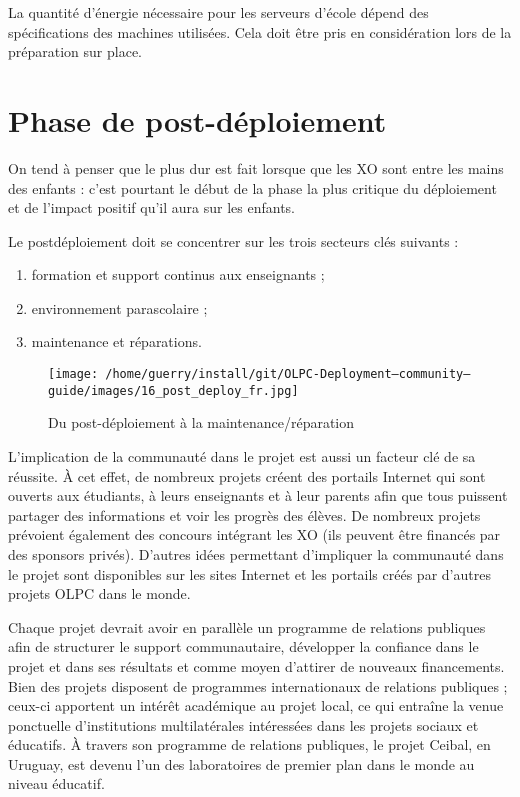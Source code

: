 \documentclass[11pt]{article}
\begin{document}
La quantité d'énergie nécessaire pour les serveurs d'école dépend des
spécifications des machines utilisées.  Cela doit être pris en
considération lors de la préparation sur place.

\pagebreak
\section{Phase de post-déploiement}
\label{sec-10}


On tend à penser que le plus dur est fait lorsque que les XO sont entre les
mains des enfants : c'est pourtant le début de la phase la plus critique du
déploiement et de l'impact positif qu'il aura sur les enfants.

Le postdéploiement doit se concentrer sur les trois secteurs clés suivants :


\begin{enumerate}
\item formation et support continus aux enseignants ;
\item environnement parascolaire ;
\item maintenance et réparations.
\end{enumerate}

\begin{figure}[htb]
\centering
\texttt{[image: /home/guerry/install/git/OLPC-Deployment--community--guide/images/16\_post\_deploy\_fr.jpg]}
\caption{Du post-déploiement à la maintenance/réparation}
\end{figure}

L'implication de la communauté dans le projet est aussi un facteur clé de
sa réussite. À cet effet, de nombreux projets créent des portails Internet
qui sont ouverts aux étudiants, à leurs enseignants et à leur parents afin
que tous puissent partager des informations et voir les progrès des
élèves. De nombreux projets prévoient également des concours intégrant les
XO (ils peuvent être financés par des sponsors privés). D'autres idées
permettant d'impliquer la communauté dans le projet sont disponibles sur
les sites Internet et les portails créés par d'autres projets OLPC dans le
monde.

Chaque projet devrait avoir en parallèle un programme de relations
publiques afin de structurer le support communautaire, développer la
confiance dans le projet et dans ses résultats et comme moyen d'attirer de
nouveaux financements. Bien des projets disposent de programmes
internationaux de relations publiques ; ceux-ci apportent un intérêt
académique au projet local, ce qui entraîne la venue ponctuelle
d'institutions multilatérales intéressées dans les projets sociaux et
éducatifs. À travers son programme de relations publiques, le projet
Ceibal, en Uruguay, est devenu l'un des laboratoires de premier plan dans
le monde au niveau éducatif.
\end{document}
